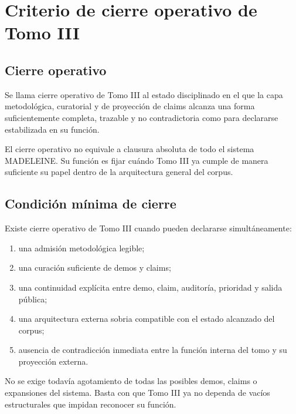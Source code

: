 \chapter{Criterio de cierre operativo de Tomo III}

\section{Cierre operativo}
\begin{definition}
Se llama cierre operativo de Tomo III al estado disciplinado en el que la capa metodológica, curatorial y de proyección de claims alcanza una forma suficientemente completa, trazable y no contradictoria como para declararse estabilizada en su función.
\end{definition}

\begin{observation}
El cierre operativo no equivale a clausura absoluta de todo el sistema MADELEINE. Su función es fijar cuándo Tomo III ya cumple de manera suficiente su papel dentro de la arquitectura general del corpus.
\end{observation}

\section{Condición mínima de cierre}
\begin{definition}
Existe cierre operativo de Tomo III cuando pueden declararse simultáneamente:
\begin{enumerate}
  \item una admisión metodológica legible;
  \item una curación suficiente de demos y claims;
  \item una continuidad explícita entre demo, claim, auditoría, prioridad y salida pública;
  \item una arquitectura externa sobria compatible con el estado alcanzado del corpus;
  \item ausencia de contradicción inmediata entre la función interna del tomo y su proyección externa.
\end{enumerate}
\end{definition}

\begin{observation}
No se exige todavía agotamiento de todas las posibles demos, claims o expansiones del sistema. Basta con que Tomo III ya no dependa de vacíos estructurales que impidan reconocer su función.
\end{observation}


